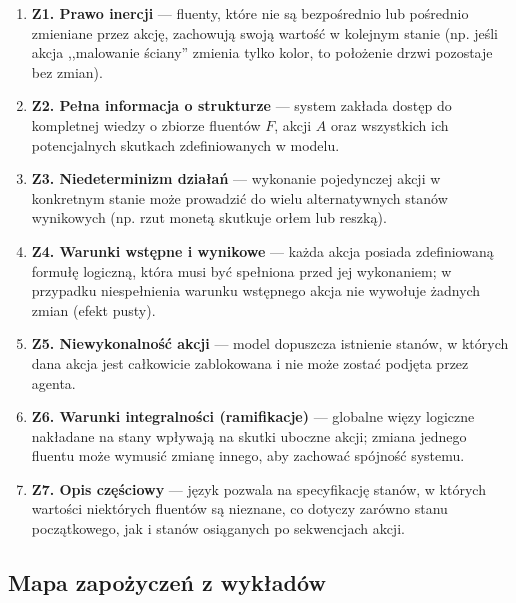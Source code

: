 \documentclass[11pt,a4paper]{article}
\theoremstyle{definition}
\begin{document}
\begin{enumerate}

\item \textbf{Z1. Prawo inercji} --- fluenty, które nie są bezpośrednio lub pośrednio zmieniane przez akcję, zachowują swoją wartość w kolejnym stanie (np. jeśli akcja ,,malowanie ściany'' zmienia tylko kolor, to położenie drzwi pozostaje bez zmian).

\item \textbf{Z2. Pełna informacja o strukturze} --- system zakłada dostęp do kompletnej wiedzy o zbiorze fluentów $F$, akcji $A$ oraz wszystkich ich potencjalnych skutkach zdefiniowanych w modelu.

\item \textbf{Z3. Niedeterminizm działań} --- wykonanie pojedynczej akcji w konkretnym stanie może prowadzić do wielu alternatywnych stanów wynikowych (np. rzut monetą skutkuje orłem lub reszką).

\item \textbf{Z4. Warunki wstępne i wynikowe} --- każda akcja posiada zdefiniowaną formułę logiczną, która musi być spełniona przed jej wykonaniem; w przypadku niespełnienia warunku wstępnego akcja nie wywołuje żadnych zmian (efekt pusty).

\item \textbf{Z5. Niewykonalność akcji} --- model dopuszcza istnienie stanów, w których dana akcja jest całkowicie zablokowana i nie może zostać podjęta przez agenta.

\item \textbf{Z6. Warunki integralności (ramifikacje)} --- globalne więzy logiczne nakładane na stany wpływają na skutki uboczne akcji; zmiana jednego fluentu może wymusić zmianę innego, aby zachować spójność systemu.

\item \textbf{Z7. Opis częściowy} --- język pozwala na specyfikację stanów, w których wartości niektórych fluentów są nieznane, co dotyczy zarówno stanu początkowego, jak i stanów osiąganych po sekwencjach akcji.

\end{enumerate}

\subsection{Mapa zapożyczeń z wykładów}
\end{document}
